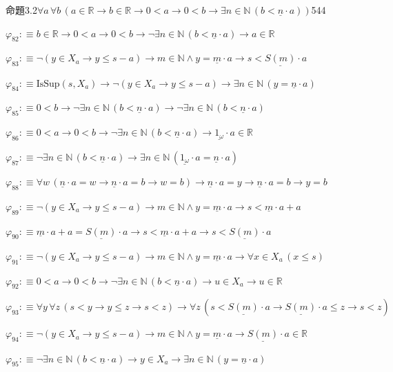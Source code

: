 \begin{fullproof}{命題3.2}{$\forall a\,\forall b\,(a \in \mathbb{R} \to b \in \mathbb{R} \to 0 < a \to 0 < b \to \exists n \in \mathbb{N}\,(b < \underline{n} \cdot a))$}{544}
\begin{abbrevlist}
\item $\varphi_{82} :\equiv b \in \mathbb{R} \to 0 < a \to 0 < b \to \neg \exists n \in \mathbb{N}\,(b < \underline{n} \cdot a) \to a \in \mathbb{R}$
\item $\varphi_{83} :\equiv \neg (y \in X_{a} \to y \leq s - a) \to m \in \mathbb{N} \land y = \underline{m} \cdot a \to s < \underline{S(m)} \cdot a$
\item $\varphi_{84} :\equiv \mathrm{IsSup}(s,X_{a}) \to \neg (y \in X_{a} \to y \leq s - a) \to \exists n \in \mathbb{N}\,(y = \underline{n} \cdot a)$
\item $\varphi_{85} :\equiv 0 < b \to \neg \exists n \in \mathbb{N}\,(b < \underline{n} \cdot a) \to \neg \exists n \in \mathbb{N}\,(b < \underline{n} \cdot a)$
\item $\varphi_{86} :\equiv 0 < a \to 0 < b \to \neg \exists n \in \mathbb{N}\,(b < \underline{n} \cdot a) \to \underline{1_{\omega}} \cdot a \in \mathbb{R}$
\item $\varphi_{87} :\equiv \neg \exists n \in \mathbb{N}\,(b < \underline{n} \cdot a) \to \exists n \in \mathbb{N}\,(\underline{1_{\omega}} \cdot a = \underline{n} \cdot a)$
\item $\varphi_{88} :\equiv \forall w\,(\underline{n} \cdot a = w \to \underline{n} \cdot a = b \to w = b) \to \underline{n} \cdot a = y \to \underline{n} \cdot a = b \to y = b$
\item $\varphi_{89} :\equiv \neg (y \in X_{a} \to y \leq s - a) \to m \in \mathbb{N} \land y = \underline{m} \cdot a \to s < \underline{m} \cdot a + a$
\item $\varphi_{90} :\equiv \underline{m} \cdot a + a = \underline{S(m)} \cdot a \to s < \underline{m} \cdot a + a \to s < \underline{S(m)} \cdot a$
\item $\varphi_{91} :\equiv \neg (y \in X_{a} \to y \leq s - a) \to m \in \mathbb{N} \land y = \underline{m} \cdot a \to \forall x \in X_{a}\,(x \leq s)$
\item $\varphi_{92} :\equiv 0 < a \to 0 < b \to \neg \exists n \in \mathbb{N}\,(b < \underline{n} \cdot a) \to u \in X_{a} \to u \in \mathbb{R}$
\item $\varphi_{93} :\equiv \forall y\,\forall z\,(s < y \to y \leq z \to s < z) \to \forall z\,(s < \underline{S(m)} \cdot a \to \underline{S(m)} \cdot a \leq z \to s < z)$
\item $\varphi_{94} :\equiv \neg (y \in X_{a} \to y \leq s - a) \to m \in \mathbb{N} \land y = \underline{m} \cdot a \to \underline{S(m)} \cdot a \in \mathbb{R}$
\item $\varphi_{95} :\equiv \neg \exists n \in \mathbb{N}\,(b < \underline{n} \cdot a) \to y \in X_{a} \to \exists n \in \mathbb{N}\,(y = \underline{n} \cdot a)$

\end{abbrevlist}
\end{fullproof}

